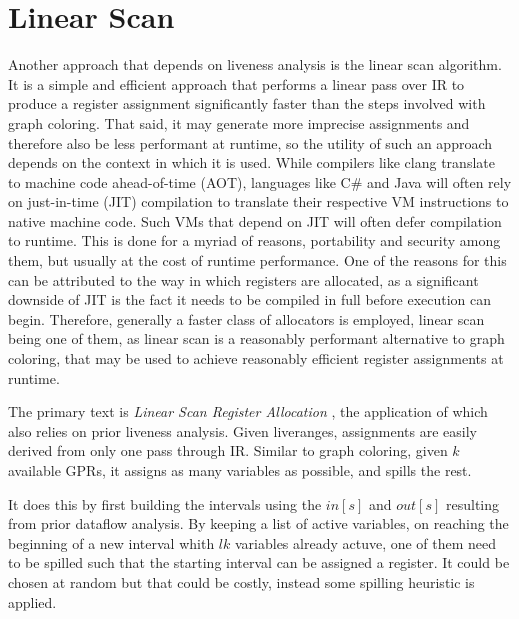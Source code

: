 \documentclass{article}
\begin{document}
\section{Linear Scan}
Another approach that depends on liveness analysis is the linear scan algorithm.
It is a simple and efficient approach that performs a linear pass over IR to produce a register assignment significantly faster than the steps involved with graph coloring.
That said, it may generate more imprecise assignments and therefore also be less performant at runtime, so the utility of such an approach depends on the context in which it is used.
While compilers like clang translate to machine code ahead-of-time (AOT), languages like C\# and Java will often rely on just-in-time (JIT) compilation to translate their respective VM instructions to native machine code. Such VMs that depend on JIT will often defer compilation to runtime. This is done for a myriad of reasons, portability and security among them, but usually at the cost of runtime performance. One of the reasons for this can be attributed to the way in which registers are allocated, as a significant downside of JIT is the fact it needs to be compiled in full before execution can begin. Therefore, generally a faster class of allocators is employed, linear scan being one of them, as linear scan is a reasonably performant alternative to graph coloring, that may be used to achieve reasonably efficient register assignments at runtime.

The primary text is \textit{Linear Scan Register Allocation} \cite{linear}, the application of which also relies on prior liveness analysis. Given liveranges, assignments are easily derived from only one pass through IR.
Similar to graph coloring, given \(k\) available GPRs, it assigns  as many variables as possible, and spills the rest.

It does this by first building the intervals using the \(\mathit{in}[s]\) and \(\mathit{out}[s]\) resulting from prior dataflow analysis.
By keeping a list of active variables, on reaching the beginning of a new interval whith \(lk\) variables already actuve, one of them need to be spilled such that the starting interval can be assigned a register. It could be chosen at random but that could be costly, instead some spilling heuristic is applied.
\end{document}
